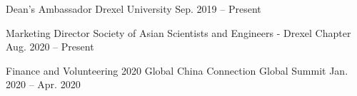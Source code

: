 
\begin{cvhonors}

  \cvhonor
  {Dean's Ambassador} %
  {Drexel University} %
  {Sep. 2019 -- Present} %

  \cvhonor
  {Marketing Director} %
  {Society of Asian Scientists and Engineers - Drexel Chapter} %
  {Aug. 2020 -- Present} %

  \cvhonor
  {Finance and Volunteering} %
  {2020 Global China Connection Global Summit} %
  {Jan. 2020 -- Apr. 2020} %

\end{cvhonors}
